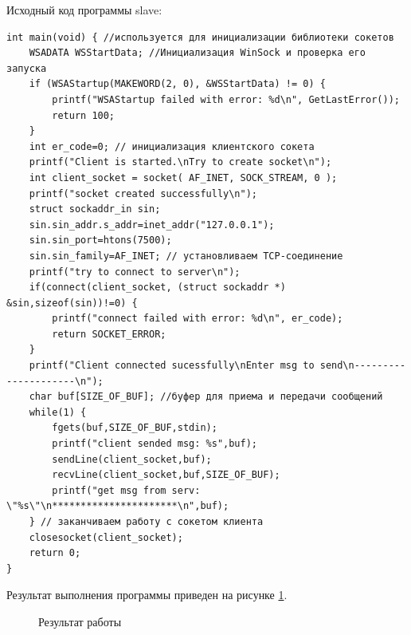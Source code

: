 \documentclass[a4paper]{article}
\begin{document}
	Исходный код программы slave:
	\begin{lstlisting}[style=crs_cpp]
int main(void) { //используется для инициализации библиотеки сокетов 
	WSADATA WSStartData; //Инициализация WinSock и проверка его запуска 
	if (WSAStartup(MAKEWORD(2, 0), &WSStartData) != 0) { 
		printf("WSAStartup failed with error: %d\n", GetLastError()); 
		return 100; 
	} 
	int er_code=0; // инициализация клиентского сокета
	printf("Client is started.\nTry to create socket\n"); 
	int client_socket = socket( AF_INET, SOCK_STREAM, 0 );
	printf("socket created successfully\n"); 
	struct sockaddr_in sin; 
	sin.sin_addr.s_addr=inet_addr("127.0.0.1");
	sin.sin_port=htons(7500); 
	sin.sin_family=AF_INET; // установливаем TCP-соединение
	printf("try to connect to server\n"); 
	if(connect(client_socket, (struct sockaddr *) &sin,sizeof(sin))!=0) { 
		printf("connect failed with error: %d\n", er_code);
		return SOCKET_ERROR;
	}
	printf("Client connected sucessfully\nEnter msg to send\n---------------------\n");
	char buf[SIZE_OF_BUF]; //буфер для приема и передачи сообщений 
	while(1) { 
		fgets(buf,SIZE_OF_BUF,stdin);
		printf("client sended msg: %s",buf);
		sendLine(client_socket,buf); 
		recvLine(client_socket,buf,SIZE_OF_BUF);
		printf("get msg from serv: \"%s\"\n**********************\n",buf); 
	} // заканчиваем работу с сокетом клиента 
	closesocket(client_socket);
	return 0;
}
	\end{lstlisting}
	
	Результат выполнения программы приведен на рисунке \ref{img:task6}.
	\begin{figure}[h!]
		\caption{Результат работы}
		\label{img:task6}
	\end{figure}
	
\end{document}
